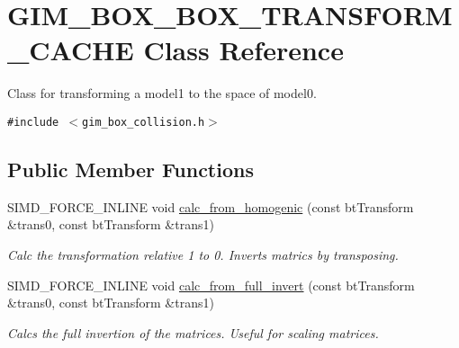 \hypertarget{class_g_i_m___b_o_x___b_o_x___t_r_a_n_s_f_o_r_m___c_a_c_h_e}{
\section{GIM\_\-BOX\_\-BOX\_\-TRANSFORM\_\-CACHE Class Reference}
\label{class_g_i_m___b_o_x___b_o_x___t_r_a_n_s_f_o_r_m___c_a_c_h_e}
}
Class for transforming a model1 to the space of model0.  


{\tt \#include $<$gim\_\-box\_\-collision.h$>$}

\subsection*{Public Member Functions}
\begin{CompactItemize}
\item 
\hypertarget{class_g_i_m___b_o_x___b_o_x___t_r_a_n_s_f_o_r_m___c_a_c_h_e_bdaefe67a2f2bbf2b89d0ad74fb9a4a5}{
SIMD\_\-FORCE\_\-INLINE void \hyperlink{class_g_i_m___b_o_x___b_o_x___t_r_a_n_s_f_o_r_m___c_a_c_h_e_bdaefe67a2f2bbf2b89d0ad74fb9a4a5}{calc\_\-from\_\-homogenic} (const btTransform \&trans0, const btTransform \&trans1)}
\label{class_g_i_m___b_o_x___b_o_x___t_r_a_n_s_f_o_r_m___c_a_c_h_e_bdaefe67a2f2bbf2b89d0ad74fb9a4a5}

\begin{CompactList}\small\item\em Calc the transformation relative 1 to 0. Inverts matrics by transposing. \item\end{CompactList}\item 
\hypertarget{class_g_i_m___b_o_x___b_o_x___t_r_a_n_s_f_o_r_m___c_a_c_h_e_29e5ec39ed30a8bc7180a90cba68dc43}{
SIMD\_\-FORCE\_\-INLINE void \hyperlink{class_g_i_m___b_o_x___b_o_x___t_r_a_n_s_f_o_r_m___c_a_c_h_e_29e5ec39ed30a8bc7180a90cba68dc43}{calc\_\-from\_\-full\_\-invert} (const btTransform \&trans0, const btTransform \&trans1)}
\label{class_g_i_m___b_o_x___b_o_x___t_r_a_n_s_f_o_r_m___c_a_c_h_e_29e5ec39ed30a8bc7180a90cba68dc43}

\begin{CompactList}\small\item\em Calcs the full invertion of the matrices. Useful for scaling matrices. \item\end{CompactList}\end{CompactItemize}
